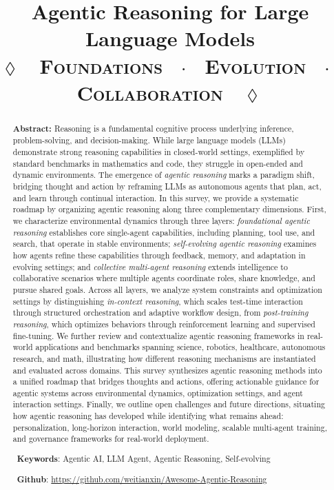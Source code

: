 \documentclass[11pt,letterpaper, logo]{mystyle}
\title{%
\textbf{Agentic Reasoning for Large Language Models}\\
\vspace{0.3em}
{\fontsize{11.5}{13.5}\selectfont\scshape\color{LARGBlue!85} $\lozenge$~ Foundations ~$\cdot$~ Evolution ~$\cdot$~ Collaboration ~$\lozenge$}
\vspace{-0.8em}
}
\author{}
\date{\vspace{-3ex}}
\begin{document}


\begin{abstract}

 \textbf{\large Abstract:} Reasoning is a fundamental cognitive process underlying inference, problem-solving, and decision-making. While large language models (LLMs) demonstrate strong reasoning capabilities in closed-world settings, exemplified by standard benchmarks in mathematics and code, they struggle in open-ended and dynamic environments. The emergence of \emph{agentic reasoning} marks a paradigm shift, bridging thought and action by reframing LLMs as autonomous agents that plan, act, and learn through continual interaction. In this survey, we provide a systematic roadmap by organizing agentic reasoning along three complementary dimensions. First, we characterize environmental dynamics through three layers: \emph{foundational agentic reasoning} establishes core single-agent capabilities, including planning, tool use, and search, that operate in stable environments; \emph{self-evolving agentic reasoning} examines how agents refine these capabilities through feedback, memory, and adaptation in evolving settings; and \emph{collective multi-agent reasoning} extends intelligence to collaborative scenarios where multiple agents coordinate roles, share knowledge, and pursue shared goals. Across all layers, we analyze system constraints and optimization settings by distinguishing \emph{in-context reasoning}, which scales test-time interaction through structured orchestration and adaptive workflow design, from \emph{post-training reasoning}, which optimizes behaviors through reinforcement learning and supervised fine-tuning. We further review and contextualize agentic reasoning frameworks in real-world applications and benchmarks spanning science, robotics, healthcare, autonomous research, and math, illustrating how different reasoning mechanisms are instantiated and evaluated across domains. This survey synthesizes agentic reasoning methods into a unified roadmap that bridges thoughts and actions, offering actionable guidance for agentic systems across environmental dynamics, optimization settings, and agent interaction settings. Finally, we outline open challenges and future directions, situating how agentic reasoning has developed while identifying what remains ahead: personalization, long-horizon interaction, world modeling, scalable multi-agent training, and governance frameworks for real-world deployment.

\vspace{5mm}
  ~\textbf{Keywords}: Agentic AI, LLM Agent, Agentic Reasoning, Self-evolving

\faGithub~\textbf{Github}: \href{https://github.com/weitianxin/Awesome-Agentic-Reasoning}{https://github.com/weitianxin/Awesome-Agentic-Reasoning}
\end{abstract}
\maketitle
\end{document}
